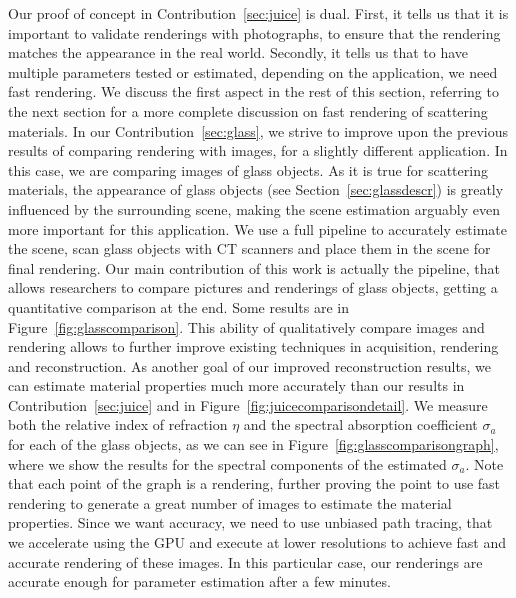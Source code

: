 Our proof of concept in Contribution~\ref{sec:juice} is dual. First, it tells us that it is important to validate renderings with photographs, to ensure that the rendering matches the appearance in the real world. Secondly, it tells us that to have multiple parameters tested or estimated, depending on the application, we need fast rendering. We discuss the first aspect in the rest of this section, referring to the next section for a more complete discussion on fast rendering of scattering materials. In our Contribution~\ref{sec:glass}, we strive to improve upon the previous results of comparing rendering with images, for a slightly different application. In this case, we are comparing images of glass objects. As it is true for scattering materials, the appearance of glass objects (see Section~\ref{sec:glassdescr}) is greatly influenced by the surrounding scene, making the scene estimation arguably even more important for this application. We use a full pipeline to accurately estimate the scene, scan glass objects with CT scanners and place them in the scene for final rendering. Our main contribution of this work is actually the pipeline, that allows researchers to compare pictures and renderings of glass objects, getting a quantitative comparison at the end. Some results are in Figure~\ref{fig:glasscomparison}. This ability of qualitatively compare images and rendering allows to further improve existing techniques in acquisition, rendering and reconstruction. As another goal of our improved reconstruction results, we can estimate material properties much more accurately than our  results in Contribution~\ref{sec:juice} and in Figure~\ref{fig:juicecomparisondetail}. We measure both the relative index of refraction $\eta$ and the spectral absorption coefficient $\sigma_a$ for each of the glass objects, as we can see in Figure~\ref{fig:glasscomparisongraph}, where we show the results for the spectral components of the estimated $\sigma_a$. Note that each point of the graph is a rendering, further proving the point to use fast rendering to generate a great number of images to estimate the material properties. Since we want accuracy, we need to use unbiased path tracing, that we accelerate using the GPU and execute at lower resolutions to achieve fast and accurate rendering of these images. In this particular case, our renderings are accurate enough for parameter estimation after a few minutes. 


